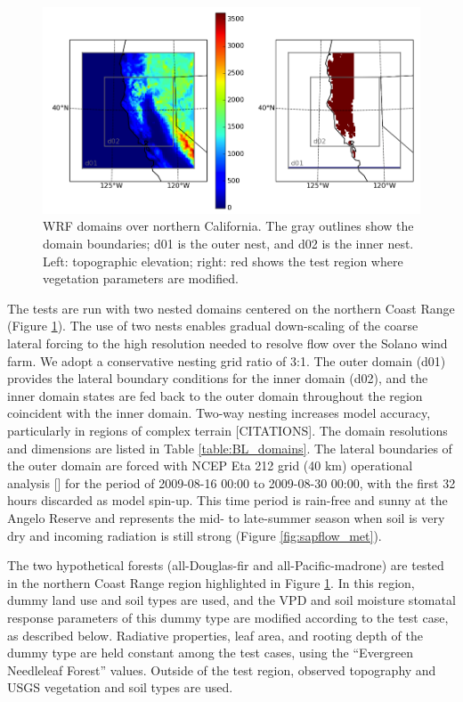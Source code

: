 \begin{figure}[here]
\includegraphics[width=1\textwidth]{ch2-BL/figures/domain_map_cropped.png}
\caption{WRF domains over northern California.  The gray outlines show the domain boundaries; d01 is the outer nest, and d02 is the inner nest.  Left: topographic elevation; right: red shows the test region where vegetation parameters are modified.}
\label{fig:BL_domain}
\end{figure}

The tests are run with two nested domains centered on the northern Coast Range (Figure \ref{fig:BL_domain}).  The use of two nests enables gradual down-scaling of the coarse lateral forcing to the high resolution needed to resolve flow over the Solano wind farm.  We adopt a conservative nesting grid ratio of 3:1.  The outer domain (d01) provides the lateral boundary conditions for the inner domain (d02), and the inner domain states are fed back to the outer domain throughout the region coincident with the inner domain.  Two-way nesting increases model accuracy, particularly in regions of complex terrain [CITATIONS].  The domain resolutions and dimensions are listed in Table \ref{table:BL_domains}.  The lateral boundaries of the outer domain are forced with NCEP Eta 212 grid (40 km) operational analysis [\cite{ncep}] for the period of 2009-08-16 00:00 to 2009-08-30 00:00, with the first 32 hours discarded as model spin-up.  This time period is rain-free and sunny at the Angelo Reserve and represents the mid- to late-summer season when soil is very dry and incoming radiation is still strong (Figure \ref{fig:sapflow_met}).

The two hypothetical forests (all-Douglas-fir and all-Pacific-madrone) are tested in the northern Coast Range region highlighted in Figure \ref{fig:BL_domain}.  In this region, dummy land use and soil types are used, and the VPD and soil moisture stomatal response parameters of this dummy type are modified according to the test case, as described below.  Radiative properties, leaf area, and rooting depth of the dummy type are held constant among the test cases, using the ``Evergreen Needleleaf Forest'' values.  Outside of the test region, observed topography and USGS vegetation and soil types are used.

